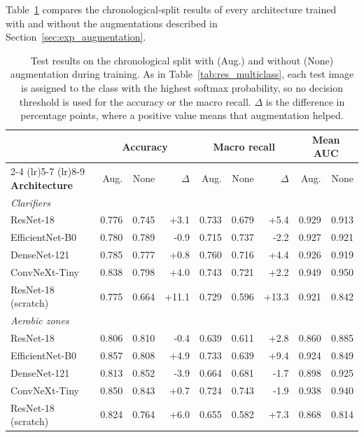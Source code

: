 Table~\ref{tab:res_augmentation} compares the chronological-split results of every architecture trained with and without the augmentations described in Section~\ref{sec:exp_augmentation}.

\begin{table}[htbp]
\centering
\setlength{\tabcolsep}{4pt}
\caption{Test results on the chronological split with (Aug.) and without (None) augmentation during training. As in Table~\ref{tab:res_multiclass}, each test image is assigned to the class with the highest softmax probability, so no decision threshold is used for the accuracy or the macro recall. $\Delta$ is the difference in percentage points, where a positive value means that augmentation helped.}
\label{tab:res_augmentation}
\begin{tabular}{l rrr rrr rr}
\toprule
& \multicolumn{3}{c}{\textbf{Accuracy}} & \multicolumn{3}{c}{\textbf{Macro recall}} & \multicolumn{2}{c}{\textbf{Mean AUC}} \\
\cmidrule(lr){2-4} \cmidrule(lr){5-7} \cmidrule(lr){8-9}
\textbf{Architecture} & Aug. & None & $\Delta$ & Aug. & None & $\Delta$ & Aug. & None \\
\midrule
\multicolumn{9}{l}{\textit{Clarifiers}} \\
ResNet-18 & 0.776 & 0.745 & +3.1 & 0.733 & 0.679 & +5.4 & 0.929 & 0.913 \\
EfficientNet-B0 & 0.780 & 0.789 & -0.9 & 0.715 & 0.737 & -2.2 & 0.927 & 0.921 \\
DenseNet-121 & 0.785 & 0.777 & +0.8 & 0.760 & 0.716 & +4.4 & 0.926 & 0.919 \\
ConvNeXt-Tiny & 0.838 & 0.798 & +4.0 & 0.743 & 0.721 & +2.2 & 0.949 & 0.950 \\
ResNet-18 (scratch) & 0.775 & 0.664 & +11.1 & 0.729 & 0.596 & +13.3 & 0.921 & 0.842 \\
\midrule
\multicolumn{9}{l}{\textit{Aerobic zones}} \\
ResNet-18 & 0.806 & 0.810 & -0.4 & 0.639 & 0.611 & +2.8 & 0.860 & 0.885 \\
EfficientNet-B0 & 0.857 & 0.808 & +4.9 & 0.733 & 0.639 & +9.4 & 0.924 & 0.849 \\
DenseNet-121 & 0.813 & 0.852 & -3.9 & 0.664 & 0.681 & -1.7 & 0.898 & 0.925 \\
ConvNeXt-Tiny & 0.850 & 0.843 & +0.7 & 0.724 & 0.743 & -1.9 & 0.938 & 0.940 \\
ResNet-18 (scratch) & 0.824 & 0.764 & +6.0 & 0.655 & 0.582 & +7.3 & 0.868 & 0.814 \\
\bottomrule
\end{tabular}
\end{table}

